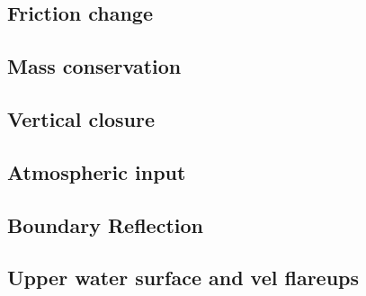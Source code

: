 	\subsection{Friction change}
	\subsection{Mass conservation}
  \subsection{Vertical closure}
	\subsection{Atmospheric input}
	\subsection{Boundary Reflection}
  \subsection{Upper water surface and vel flareups}